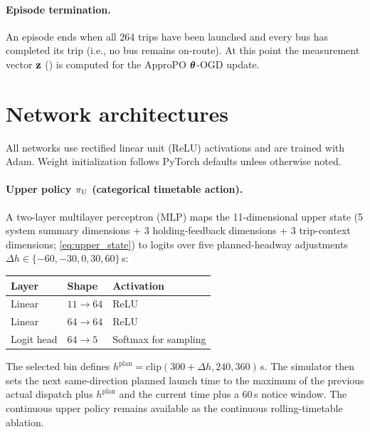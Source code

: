 \paragraph{Episode termination.}
An episode ends when all 264 trips have been launched and every bus has completed its trip (i.e., no bus remains on-route). At this point the measurement vector $\mathbf{z}$ () is computed for the ApproPO $\boldsymbol{\theta}$-OGD update.

\section{Network architectures}
\label{app:networks}

All networks use rectified linear unit (ReLU) activations and are trained with Adam. Weight initialization follows PyTorch defaults unless otherwise noted.

\paragraph{Upper policy $\pi_{\mathrm{U}}$ (categorical timetable action).}
A two-layer multilayer perceptron (MLP) maps the 11-dimensional upper state (5 system summary dimensions + 3 holding-feedback dimensions + 3 trip-context dimensions; \cref{eq:upper_state}) to logits over five planned-headway adjustments $\Delta h \in \{-60,-30,0,30,60\}$\,s:
\begin{center}
\small
\begin{tabular}{lll}
\toprule
Layer & Shape & Activation \\
\midrule
Linear & $11 \to 64$ & ReLU \\
Linear & $64 \to 64$ & ReLU \\
Logit head & $64 \to 5$ & Softmax for sampling \\
\bottomrule
\end{tabular}
\end{center}
The selected bin defines $h^{\mathrm{plan}}=\mathrm{clip}(300+\Delta h,240,360)$\,s. The simulator then sets the next same-direction planned launch time to the maximum of the previous actual dispatch plus $h^{\mathrm{plan}}$ and the current time plus a 60\,s notice window. The continuous upper policy remains available as the continuous rolling-timetable ablation.

